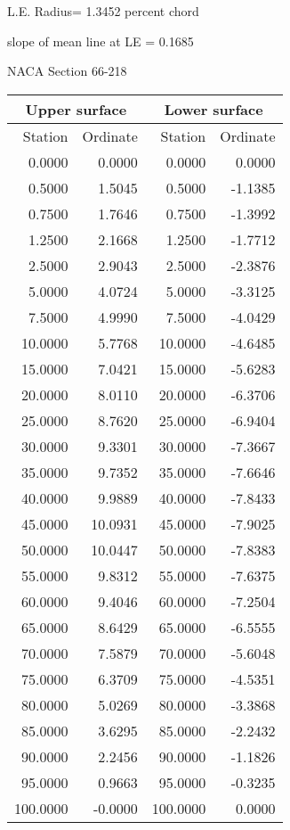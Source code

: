 \documentclass[11pt]{book}
\begin{document}
L.E. Radius=  1.3452 percent chord


 slope of mean line at LE =  0.1685
 \newpage
  \label{s66-218}
 \begin{Large}
 NACA Section 66-218
 \end{Large}
  
 \vspace{8mm}
 \begin{tabular}{|r|r|r|r|} \hline 
 \multicolumn{2}{|c|}{Upper surface} & \multicolumn{2}{|c|}{Lower surface} \\
 \hline
 Station & Ordinate & Station & Ordinate \\
 \hline
0.0000 & 0.0000 & 0.0000 & 0.0000 \\
0.5000 & 1.5045 & 0.5000 & -1.1385 \\
0.7500 & 1.7646 & 0.7500 & -1.3992 \\
1.2500 & 2.1668 & 1.2500 & -1.7712 \\
2.5000 & 2.9043 & 2.5000 & -2.3876 \\
5.0000 & 4.0724 & 5.0000 & -3.3125 \\
7.5000 & 4.9990 & 7.5000 & -4.0429 \\
10.0000 & 5.7768 & 10.0000 & -4.6485 \\
15.0000 & 7.0421 & 15.0000 & -5.6283 \\
20.0000 & 8.0110 & 20.0000 & -6.3706 \\
25.0000 & 8.7620 & 25.0000 & -6.9404 \\
30.0000 & 9.3301 & 30.0000 & -7.3667 \\
35.0000 & 9.7352 & 35.0000 & -7.6646 \\
40.0000 & 9.9889 & 40.0000 & -7.8433 \\
45.0000 & 10.0931 & 45.0000 & -7.9025 \\
50.0000 & 10.0447 & 50.0000 & -7.8383 \\
55.0000 & 9.8312 & 55.0000 & -7.6375 \\
60.0000 & 9.4046 & 60.0000 & -7.2504 \\
65.0000 & 8.6429 & 65.0000 & -6.5555 \\
70.0000 & 7.5879 & 70.0000 & -5.6048 \\
75.0000 & 6.3709 & 75.0000 & -4.5351 \\
80.0000 & 5.0269 & 80.0000 & -3.3868 \\
85.0000 & 3.6295 & 85.0000 & -2.2432 \\
90.0000 & 2.2456 & 90.0000 & -1.1826 \\
95.0000 & 0.9663 & 95.0000 & -0.3235 \\
100.0000 & -0.0000 & 100.0000 & 0.0000 \\
 \hline 
 \end{tabular}
\end{document}
